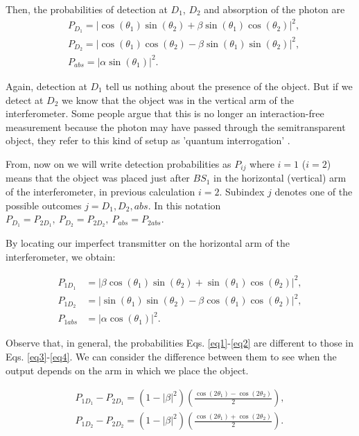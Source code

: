 \documentclass[12pt]{book}
\begin{document}
Then, the probabilities of detection at $D_1$, $D_2$ and absorption of the photon are 
\begin{align}
& P_{D_{1}}=|\cos(\theta_{1})\sin(\theta_{2})+\beta \sin(\theta_{1})\cos(\theta_{2})|^2, \label{eq1}\\
& P_{D_{2}}=|\cos(\theta_{1})\cos(\theta_{2})-\beta \sin(\theta_{1})\sin(\theta_{2})|^2, \\
& P_{abs}=|\alpha \sin(\theta_{1})|^2. \label{eq2}
\end{align}

Again, detection at $D_1$ tell us nothing about the presence of the object. But if we detect at $D_2$ we know that the object was in the vertical arm of the interferometer. Some people argue that this is no longer an interaction-free measurement because the photon may have passed through  the semitransparent object, they refer to this kind of setup as 'quantum interrogation' \cite{QI1,QI2}. 


From, now on we will write detection probabilities as $P_{ij}$ where $i=1$ ($i=2$) means that the object was placed just after $BS_1$ in the horizontal (vertical) arm of the interferometer, in previous calculation $i=2$. Subindex $j$ denotes one of the possible outcomes $j=D_{1},D_{2},abs$. In this notation $P_{D_1}= P_{2D_{1}}, ~P_{D_2}= P_{2D_{2}}, ~P_{abs}= P_{2abs} $. 

By locating our imperfect transmitter on the horizontal arm of the interferometer, we obtain:

\begin{align}
P_{1D_{1}}&=|\beta\cos(\theta_{1})\sin(\theta_{2}) +\sin(\theta_{1})\cos(\theta_{2})|^2,\label{eq3} \\
P_{1D_{2}}&=|\sin(\theta_{1})\sin(\theta_{2})-\beta \cos(\theta_{1})\cos(\theta_{2})|^2,\\
P_{1abs}&=|\alpha \cos(\theta_{1})|^2. \label{eq4}
\end{align}



Observe that, in general, the probabilities Eqs. \ref{eq1}-\ref{eq2} are different to those in Eqs. \ref{eq3}-\ref{eq4}. We can consider  the difference between them to see when the output depends on the arm in which we place the object.


\begin{align}
P_{1D_{1}}-P_{2D_{1}}=(1-|\beta|^2)\left(\frac{\cos(2 \theta_{1})-\cos(2 \theta_{2})}{2}\right), \\
P_{1D_{2}}-P_{2D_{2}}=(1-|\beta|^2)\left(\frac{\cos(2 \theta_{1})+\cos(2 \theta_{2})}{2}\right).
\end{align}
\end{document}
